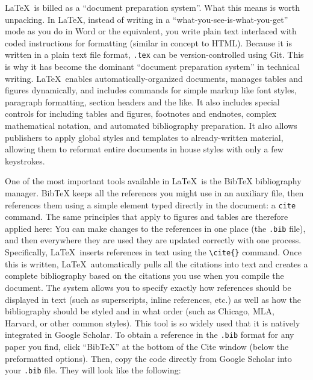 \LaTeX\ is billed as a ``document preparation system''.
What this means is worth unpacking.
In {\LaTeX}, instead of writing in a ``what-you-see-is-what-you-get'' mode
as you do in Word or the equivalent,
you write plain text interlaced with coded instructions for formatting
(similar in concept to HTML).
Because it is written in a plain text file format,
\texttt{.tex} can be version-controlled using Git.
This is why it has become the dominant ``document preparation system'' in technical writing.
\LaTeX\ enables automatically-organized documents,
manages tables and figures dynamically,
and includes commands for simple markup
like font styles, paragraph formatting, section headers and the like.
It also includes special controls for including tables and figures,
footnotes and endnotes, complex mathematical notation, and automated bibliography preparation.
It also allows publishers to apply global styles and templates to already-written material,
allowing them to reformat entire documents in house styles with only a few keystrokes.

One of the most important tools available in \LaTeX\ is the BibTeX bibliography manager.
BibTeX keeps all the references you might use in an auxiliary file,
then references them using a simple element typed directly in the document: a \texttt{cite} command.
The same principles that apply to figures and tables are therefore applied here:
You can make changes to the references in one place (the \texttt{.bib} file),
and then everywhere they are used they are updated correctly with one process.
Specifically, \LaTeX\ inserts references in text using the \texttt{\textbackslash cite\{\}} command.
Once this is written, \LaTeX\ automatically pulls all the citations into text
and creates a complete bibliography based on the citations you use when you compile the document.
The system allows you to specify exactly how references should be displayed in text
(such as superscripts, inline references, etc.)
as well as how the bibliography should be styled and in what order
(such as Chicago, MLA, Harvard, or other common styles).
This tool is so widely used that it is natively integrated in Google Scholar.
To obtain a reference in the \texttt{.bib} format for any paper you find,
click ``BibTeX'' at the bottom of the Cite window (below the preformatted options).
Then, copy the code directly from Google Scholar into your \texttt{.bib} file.
They will look like the following:

